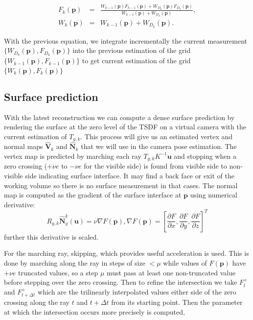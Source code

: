 \begin{eqnarray*}
 F_k(\mathbf{p}) &=& \frac{W_{k-1}(\mathbf{p}) F_{k-1}(\mathbf{p}) + W_{D_{k}}(\mathbf{p}) F_{D_{k}}(\mathbf{p}) }{ W_{k-1}(\mathbf{p}) + W_{D_{k}}(\mathbf{p}) }, \\
 W_k(\mathbf{p}) &=& W_{k-1}(\mathbf{p}) + W_{D_{k}}(\mathbf{p}).
\end{eqnarray*}

With the previous equation, we integrate incrementally the current measurement $\{ W_{D_{k}}(\mathbf{p}), F_{D_{k}}(\mathbf{p}) \}$ into the previous estimation of the grid $\{W_{k-1}(\mathbf{p}), F_{k-1}(\mathbf{p})\}$ to get current estimation of the grid $\{W_{k}(\mathbf{p}), F_{k}(\mathbf{p})\}$

\subsection{Surface prediction}
With the latest reconstruction we can compute a dense surface prediction by rendering the surface at the zero level of the TSDF on a virtual camera with the current estimation of $T_{g,k}$. This process will give us an estimated vertex and normal maps $\hat{\mathbf{V}}_k$ and $\hat{\mathbf{N}}_k$ that we will use in the camera pose estimation.
The vertex map is predicted by marching each ray $T_{g,k}K^{-1}\mathbf{u}$ and stopping when a zero crossing ($+\nu e$ to $-\nu e$ for the visible side) is found from visible side to non-visible side indicating surface interface.
It may find a back face or exit of the working volume so there is no surface measurement in that cases.
The normal map is computed as the gradient of the surface interface at $\mathbf{p}$ using numerical derivative:
\begin{equation}
 R_{g,k} \hat{\mathbf{N}}_g^k(\mathbf{u}) = \nu \nabla F(\mathbf{p}), \nabla F(\mathbf{p}) = \left [ \frac{\partial F}{\partial x}, \frac{\partial F}{\partial y}, \frac{\partial F}{\partial z} \right ]^T
\end{equation}
further this derivative is scaled.

For the marching ray, skipping, which provides useful acceleration is used. This is done by marching along the ray in steps of size $< \mu$ while values of $F(\mathbf{p})$ have $+ \nu e$ truncated values, so a step $\mu$ must pass at least one non-truncated value before stepping over the zero crossing.
Then to refine the intersection we take $F^+_t$ and $F^+_{t+\Delta t}$ which are the trilinearly interpolated values either side of the zero crossing along the ray $t$ and $t+\Delta t$ from its starting point.
Then the parameter at which the intersection occurs more precisely is computed,

